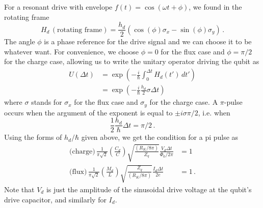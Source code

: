 For a resonant drive with envelope $f(t) = \cos(\omega t + \phi)$, we found in the rotating frame
\begin{equation*}
  H_d \, (\text{rotating frame})
  = \frac{h_d}{2} \left( \cos(\phi) \sigma_x - \sin(\phi) \sigma_y \right) \, .
\end{equation*}
The angle $\phi$ is a phase reference for the drive signal and we can choose it to be whatever want.
For convenience, we choose $\phi=0$ for the flux case and $\phi=\pi/2$ for the charge case, allowing us to write the unitary operator driving the qubit as
\begin{align*}
  U(\Delta t)
  &= \exp \left( -\frac{i}{\hbar} \int_0^{\Delta t} H_d(t') \, dt' \right) \\
  &= \exp \left( -\frac{i}{\hbar} \frac{h_d}{2} \sigma \Delta t \right)
\end{align*}
where $\sigma$ stands for $\sigma_x$ for the flux case and $\sigma_y$ for the charge case.
A $\pi$-pulse occurs when the argument of the exponent is equal to $\pm i \sigma \pi / 2$, i.e. when
\begin{equation*}
  \frac{1}{2} \frac{h_d}{\hbar} \Delta t = \pi / 2 \, .
\end{equation*}
Using the forms of $h_d/\hbar$ given above, we get the condition for a pi pulse as
\begin{align*}
  \text{(charge)} \, \frac{1}{\pi\sqrt{2}} \left( \frac{C_d}{C} \right) \sqrt{\frac{(R_K/8\pi)}{Z_q}} \frac{V_d \Delta t}{\Phi_0/2\pi} &= 1 \\
  \text{(flux)} \, \frac{1}{\pi\sqrt{2}} \left( \frac{M_d}{L} \right) \sqrt{\frac{Z_q}{(R_K/8\pi)}} \frac{I_d \Delta t}{2e} &= 1 \, .
\end{align*}
Note that $V_d$ is just the amplitude of the sinusoidal drive voltage at the qubit's drive capacitor, and similarly for $I_d$.


